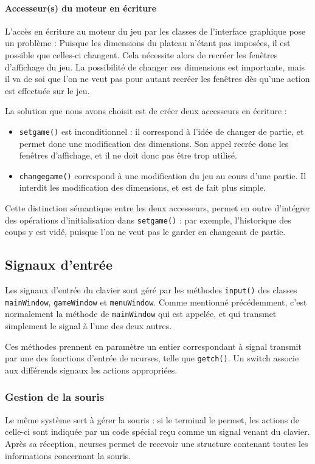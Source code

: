 \documentclass[11pt,a4paper]{article}
\begin{document}
\paragraph{Accesseur(s) du moteur en écriture}
L'accès en écriture au moteur du jeu par les classes de l'interface graphique pose un problème : Puisque les dimensions du plateau n'étant pas imposées, il est possible que celles-ci changent. Cela nécessite alors de recréer les fenêtres d'affichage du jeu. La possibilité de changer ces dimensions est importante, mais il va de soi que l'on ne veut pas pour autant recréer les fenêtres dès qu'une action est effectuée sur le jeu.

La solution que nous avons choisit est de créer deux accesseurs en écriture :
\begin{itemize}
\item 
\verb"setgame()" est inconditionnel : il correspond à l'idée de changer de partie, et permet donc une modification des dimensions. Son appel recrée donc les fenêtres d'affichage, et il ne doit donc pas être trop utilisé.
\item
\verb"changegame()" correspond à une modification du jeu au cours d'une partie. Il interdit les modification des dimensions, et est de fait plus simple.
\end{itemize}

Cette distinction sémantique entre les deux accesseurs, permet en outre d'intégrer des opérations d'initialisation dans \verb"setgame()" : par exemple, l'historique des coups y est vidé, puisque l'on ne veut pas le garder en changeant de partie.

\subsection{Signaux d'entrée}
Les signaux d'entrée du clavier sont géré par les méthodes \verb"input()" des classes \verb"mainWindow", \verb"gameWindow" et \verb"menuWindow". Comme mentionné précédemment, c'est normalement la méthode de \verb"mainWindow" qui est appelée, et qui transmet simplement le signal à l'une des deux autres.

Ces méthodes prennent en paramètre un entier correspondant à signal transmit par une des fonctions d'entrée de ncurses, telle que \verb"getch()". Un switch associe aux différends signaux les actions appropriées.

\subsubsection{Gestion de la souris}
Le même système sert à gérer la souris : si le terminal le permet, les actions de celle-ci sont indiquée par un code spécial reçu comme un signal venant du clavier. Après sa réception, ncurses permet de recevoir une structure contenant toutes les informations concernant la souris.
\end{document}
